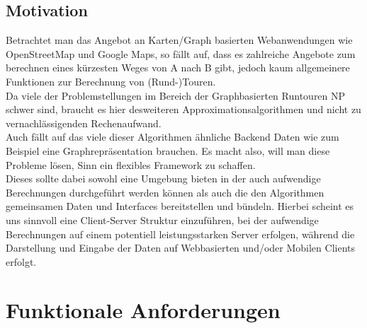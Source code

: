 \documentclass[a4paper,10pt,titlepage]{article}
\begin{document}
\subsection{Motivation}
Betrachtet man das Angebot an Karten/Graph basierten Webanwendungen wie OpenStreetMap und Google Maps, so fällt auf, dass
es zahlreiche Angebote zum berechnen eines kürzesten Weges von A nach B gibt, jedoch kaum allgemeinere Funktionen zur
Berechnung von (Rund-)Touren.\\
Da viele der Problemstellungen im Bereich der Graphbasierten Runtouren NP schwer sind, braucht es hier desweiteren Approximationsalgorithmen und
nicht zu vernachlässigenden Rechenaufwand.\\
Auch fällt auf das viele dieser Algorithmen ähnliche Backend Daten wie zum Beispiel eine Graphrepräsentation brauchen. Es macht also, will man diese Probleme lösen,
Sinn ein flexibles Framework zu schaffen.\\
Dieses sollte dabei sowohl eine Umgebung bieten in der auch aufwendige Berechnungen durchgeführt werden können als auch die den Algorithmen gemeinsamen Daten und Interfaces
bereitstellen und bündeln. Hierbei scheint es uns sinnvoll eine Client-Server Struktur einzuführen, bei der aufwendige Berechnungen auf einem potentiell leistungsstarken Server erfolgen, während die Darstellung und Eingabe der Daten auf Webbasierten und/oder Mobilen Clients erfolgt.

\section{Funktionale Anforderungen}
\end{document}
